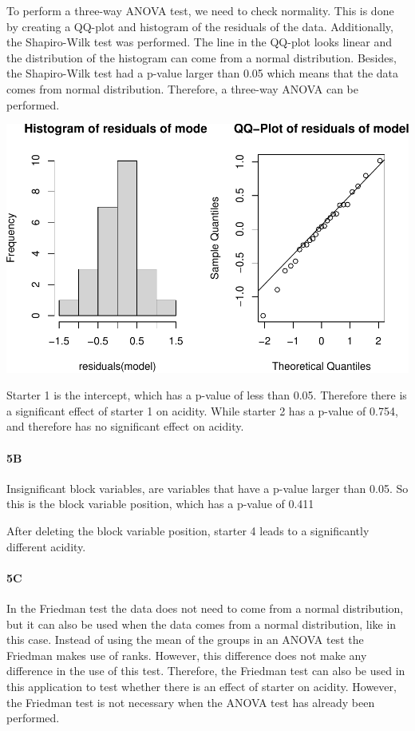 \documentclass[
]{article}
\begin{document}
To perform a three-way ANOVA test, we need to check normality. This is
done by creating a QQ-plot and histogram of the residuals of the data.
Additionally, the Shapiro-Wilk test was performed. The line in the
QQ-plot looks linear and the distribution of the histogram can come from
a normal distribution. Besides, the Shapiro-Wilk test had a p-value
larger than 0.05 which means that the data comes from normal
distribution. Therefore, a three-way ANOVA can be performed.

\includegraphics{assignment1_group75_final_files/figure-latex/unnamed-chunk-34-1.pdf}

Starter 1 is the intercept, which has a p-value of less than 0.05.
Therefore there is a significant effect of starter 1 on acidity. While
starter 2 has a p-value of 0.754, and therefore has no significant
effect on acidity.

\hypertarget{b-4}{%
\paragraph{\texorpdfstring{\textbf{5B}}{5B}}\label{b-4}}

Insignificant block variables, are variables that have a p-value larger
than 0.05. So this is the block variable position, which has a p-value
of 0.411

After deleting the block variable position, starter 4 leads to a
significantly different acidity.

\hypertarget{c-4}{%
\paragraph{\texorpdfstring{\textbf{5C}}{5C}}\label{c-4}}

In the Friedman test the data does not need to come from a normal
distribution, but it can also be used when the data comes from a normal
distribution, like in this case. Instead of using the mean of the groups
in an ANOVA test the Friedman makes use of ranks. However, this
difference does not make any difference in the use of this test.
Therefore, the Friedman test can also be used in this application to
test whether there is an effect of starter on acidity. However, the
Friedman test is not necessary when the ANOVA test has already been
performed.
\end{document}
